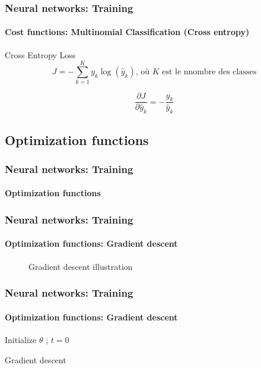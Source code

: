 \documentclass[xcolor=table]{beamer}
\begin{document}
\begin{frame}
	\frametitle{Neural networks: Training}
	\framesubtitle{Cost functions: Multinomial Classification (Cross entropy)}

\begin{block}{Cross Entropy Loss}
	\[J = - \sum\limits_{k=1}^{K} y_{k} \log(\hat{y}_{k}) \text{, où } K \text{ est le nnombre des classes} \]
	
	\[
	\frac{\partial J}{\partial \hat{y}_k} = - \frac{y_{k}}{\hat{y}_{k}}
	\]
\end{block}


\end{frame}

\subsection{Optimization functions}

\begin{frame}
	\frametitle{Neural networks: Training}
	\framesubtitle{Optimization functions}
	
\end{frame}

\begin{frame}
	\frametitle{Neural networks: Training}
	\framesubtitle{Optimization functions: Gradient descent}

\begin{figure}
	\caption{Gradient descent illustration \cite{2020-calin}}
\end{figure}

\end{frame}

\begin{frame}
	\frametitle{Neural networks: Training}
	\framesubtitle{Optimization functions: Gradient descent}

\begin{algorithm}[H]
	\KwResult{$ \theta $}
	Initialize $ \theta $ ; $ t = 0 $\;
	\caption{Gradient descent}
\end{algorithm}

\end{frame}
\end{document}
